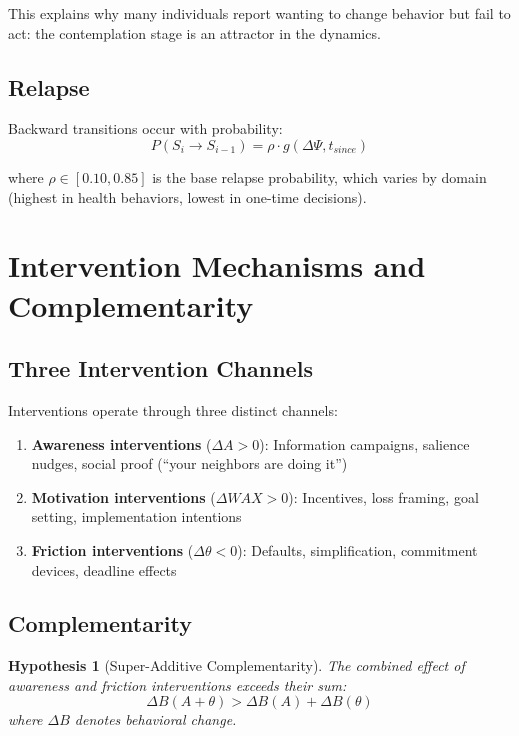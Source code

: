 \documentclass[12pt]{article}
\newtheorem{hypothesis}{Hypothesis}
\begin{document}
This explains why many individuals report wanting to change behavior but fail to act: the contemplation stage is an attractor in the dynamics.

\subsection{Relapse}

Backward transitions occur with probability:
\begin{equation}
P(S_i \to S_{i-1}) = \rho \cdot g(\Delta\Psi, t_{since})
\end{equation}

where $\rho \in [0.10, 0.85]$ is the base relapse probability, which varies by domain (highest in health behaviors, lowest in one-time decisions).



\section{Intervention Mechanisms and Complementarity}

\subsection{Three Intervention Channels}

Interventions operate through three distinct channels:

\begin{enumerate}
    \item \textbf{Awareness interventions} ($\Delta A > 0$): Information campaigns, salience nudges, social proof (``your neighbors are doing it'')
    \item \textbf{Motivation interventions} ($\Delta WAX > 0$): Incentives, loss framing, goal setting, implementation intentions
    \item \textbf{Friction interventions} ($\Delta \theta < 0$): Defaults, simplification, commitment devices, deadline effects
\end{enumerate}

\subsection{Complementarity}

\begin{hypothesis}[Super-Additive Complementarity]
\label{hyp:complementarity}
The combined effect of awareness and friction interventions exceeds their sum:
\begin{equation}
\Delta B(A + \theta) > \Delta B(A) + \Delta B(\theta)
\end{equation}
where $\Delta B$ denotes behavioral change.
\end{hypothesis}
\end{document}
